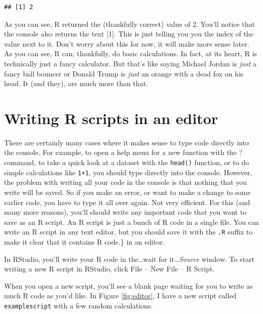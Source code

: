 \documentclass[
]{book}
\begin{document}
\begin{verbatim}
## [1] 2
\end{verbatim}

As you can see, R returned the (thankfully correct) value of 2. You'll notice that the console also returns the text {[}1{]}. This is just telling you you the index of the value next to it. Don't worry about this for now, it will make more sense later. As you can see, R can, thankfully, do basic calculations. In fact, at its heart, R is technically just a fancy calculator. But that's like saying Michael Jordan is \emph{just} a fancy ball bouncer or Donald Trump is \emph{just} an orange with a dead fox on his head. It (and they), are much more than that.

\hypertarget{writing-r-scripts-in-an-editor}{%
\section{Writing R scripts in an editor}\label{writing-r-scripts-in-an-editor}}

There are certainly many cases where it makes sense to type code directly into the console. For example, to open a help menu for a new function with the ? command, to take a quick look at a dataset with the \texttt{head()} function, or to do simple calculations like \texttt{1+1}, you should type directly into the console. However, the problem with writing all your code in the console is that nothing that you write will be saved. So if you make an error, or want to make a change to some earlier code, you have to type it all over again. Not very efficient. For this (and many more reasons), you'll should write any important code that you want to save as an R script. An R script is just a bunch of R code in a single file. You can write an R script in any text editor, but you should save it with the \texttt{.R} suffix to make it clear that it contains R code.\} in an editor.

In RStudio, you'll write your R code in the\ldots wait for it\ldots{}\emph{Source} window. To start writing a new R script in RStudio, click File -- New File -- R Script.

When you open a new script, you'll see a blank page waiting for you to write as much R code as you'd like. In Figure \ref{fig:editor}, I have a new script called \texttt{examplescript} with a few random calculations.
\end{document}
